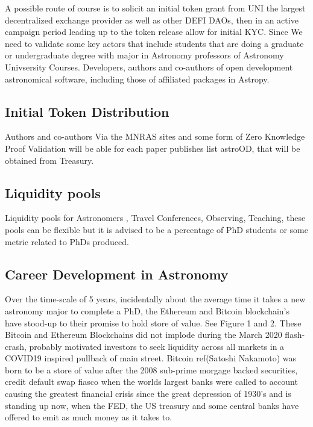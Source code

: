 \documentclass[final,5p,times,twocolumn,authoryear]{elsarticle}
\begin{document}
A possible route of course is to solicit an initial token grant from UNI the largest decentralized exchange provider as well as other DEFI DAOs, then in an active campaign period leading up to the token release allow for initial KYC. Since We need to validate some key actors that include students that are doing a graduate or undergraduate degree with major in Astronomy professors of Astronomy Univsersity Courses. Developers, authors and co-authors of open development astronomical software, including those of affiliated packages in Astropy. 

\subsection{Initial Token Distribution}

Authors and co-authors Via the MNRAS sites and some form of Zero Knowledge Proof Validation will be able for each paper publishes list astroOD, that will be obtained from Treasury.

\subsection{Liquidity pools}

Liquidity pools for Astronomers , Travel Conferences, Observing, Teaching, these pools can be flexible but it is advised to be a percentage of PhD  students or some metric related to PhDs produced. 

\subsection{Career Development in Astronomy}

Over the time-scale of 5 years, incidentally about the average time it takes a new astronomy major to complete a PhD, the Ethereum and Bitcoin blockchain's have stood-up to their promise to hold store of value. See Figure 1 and 2. These Bitcoin and Ethereum Blockchains did not implode during the March 2020 flash-crash, probably motivated investors to seek liquidity across all markets in a COVID19 inspired pullback of main street.  Bitcoin ref(Satoshi Nakamoto) was born to be a store of value after the 2008 sub-prime morgage backed securities, credit default swap fiasco when the worlds largest banks were called to account causing the greatest financial crisis since the great depression of 1930's and is standing up now, when the FED, the US treasury and some central banks have offered to emit as much money as it takes to.
 
\end{document}
